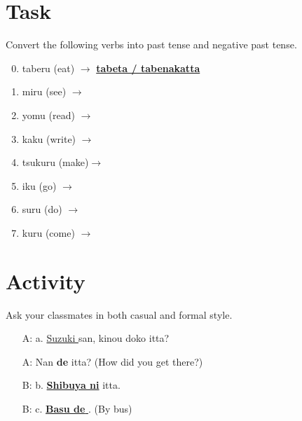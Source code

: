 \documentclass[uplatex,a4paper]{jsarticle}
\begin{document}

\section{Task}
 
Convert the following verbs into past tense and negative past tense.

\begin{multicols}{2}
\begin{enumerate}
\setcounter{enumi}{-1}   
 \item  taberu (eat)  $\rightarrow$ \underline{\bfseries tabeta / tabenakatta\hspace{1em}}
 \item  miru (see)    $\rightarrow$ \hrulefill
 \item  yomu (read)   $\rightarrow$ \hrulefill
 \item  kaku (write)  $\rightarrow$ \hrulefill
 \item  tsukuru (make)$\rightarrow$ \hrulefill
 \item  iku  (go)     $\rightarrow$ \hrulefill
 \item  suru (do)     $\rightarrow$ \hrulefill
 \item  kuru (come)   $\rightarrow$ \hrulefill
\end{enumerate}
\end{multicols}

\section{Activity}

Ask your classmates in both casual and formal style.

\begin{multicols}{2}
\begin{itemize}
 \item[A:] a. \underline{ Suzuki } san, kinou doko itta?
 \item[A:] Nan {\bfseries de} itta? (How did you get there?)
 \item[B:] b. \underline{ {\bfseries Shibuya ni}} itta.
 \item[B:] c. \underline{ {\bfseries Basu de} }. (By bus)
\end{itemize}
\end{multicols}
\end{document}
